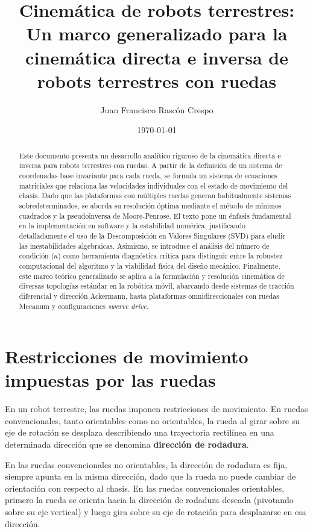 \documentclass[11pt,a4paper]{article}
\title{Cinemática de robots terrestres: Un marco generalizado para la cinemática directa e inversa de robots terrestres con ruedas}
\author{Juan Francisco Rascón Crespo}
\date{\today}
\begin{document}
\maketitle

\begin{abstract}
    Este documento presenta un desarrollo analítico riguroso de la cinemática directa e inversa para robots terrestres con ruedas. A partir de la definición de un sistema de coordenadas base invariante para cada rueda, se formula un sistema de ecuaciones matriciales que relaciona las velocidades individuales con el estado de movimiento del chasis. Dado que las plataformas con múltiples ruedas generan habitualmente sistemas sobredeterminados, se aborda su resolución óptima mediante el método de mínimos cuadrados y la pseudoinversa de Moore-Penrose. El texto pone un énfasis fundamental en la implementación en software y la estabilidad numérica, justificando detalladamente el uso de la Descomposición en Valores Singulares (SVD) para eludir las inestabilidades algebraicas. Asimismo, se introduce el análisis del número de condición (\(\kappa\)) como herramienta diagnóstica crítica para distinguir entre la robustez computacional del algoritmo y la viabilidad física del diseño mecánico. Finalmente, este marco teórico generalizado se aplica a la formulación y resolución cinemática de diversas topologías estándar en la robótica móvil, abarcando desde sistemas de tracción diferencial y dirección Ackermann, hasta plataformas omnidireccionales con ruedas Mecanum y configuraciones \textit{swerve drive}.
\end{abstract}

\section{Restricciones de movimiento impuestas por las ruedas}

En un robot terrestre, las ruedas imponen restricciones de movimiento. En ruedas convencionales, tanto orientables como no orientables, la rueda al girar sobre su eje de rotación se desplaza describiendo una trayectoria rectilínea en una determinada dirección que se denomina \textbf{dirección de rodadura}.

En las ruedas convencionales no orientables, la dirección de rodadura es fija, siempre apunta en la misma dirección, dado que la rueda no puede cambiar de orientación con respecto al chasis. En las ruedas convencionales orientables, primero la rueda se orienta hacia la dirección de rodadura deseada (pivotando sobre su eje vertical) y luego gira sobre su eje de rotación para desplazarse en esa dirección.
\end{document}
